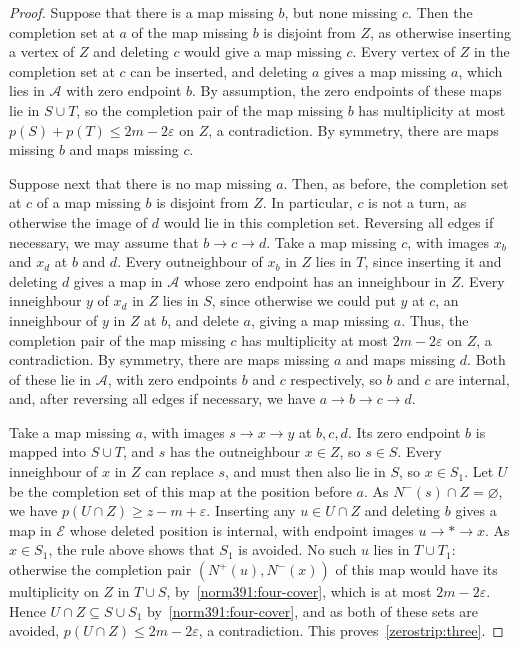 \begin{proof}
Suppose that there is a map missing $b$, but none missing $c$. Then the completion set at $a$ of the map missing $b$ is disjoint from $Z$, as otherwise inserting a vertex of $Z$ and deleting $c$ would give a map missing $c$. Every vertex of $Z$ in the completion set at $c$ can be inserted, and deleting $a$ gives a map missing $a$, which lies in $\mathcal A$ with zero endpoint $b$. By assumption, the zero endpoints of these maps lie in $S\cup T$, so the completion pair of the map missing $b$ has multiplicity at most $p(S)+p(T)\le2m-2\varepsilon$ on $Z$, a contradiction. By symmetry, there are maps missing $b$ and maps missing $c$.

Suppose next that there is no map missing $a$. Then, as before, the completion set at $c$ of a map missing $b$ is disjoint from $Z$. In particular, $c$ is not a turn, as otherwise the image of $d$ would lie in this completion set. Reversing all edges if necessary, we may assume that $b\to c\to d$. Take a map missing $c$, with images $x_b$ and $x_d$ at $b$ and $d$. Every outneighbour of $x_b$ in $Z$ lies in $T$, since inserting it and deleting $d$ gives a map in $\mathcal A$ whose zero endpoint has an inneighbour in $Z$. Every inneighbour $y$ of $x_d$ in $Z$ lies in $S$, since otherwise we could put $y$ at $c$, an inneighbour of $y$ in $Z$ at $b$, and delete $a$, giving a map missing $a$. Thus, the completion pair of the map missing $c$ has multiplicity at most $2m-2\varepsilon$ on $Z$, a contradiction. By symmetry, there are maps missing $a$ and maps missing $d$.
Both of these lie in $\mathcal A$, with zero endpoints $b$ and $c$ respectively, so $b$ and $c$ are internal, and, after reversing all edges if necessary, we have $a\to b\to c\to d$.

Take a map missing $a$, with images $s\to x\to y$ at $b,c,d$. Its zero endpoint $b$ is mapped into $S\cup T$, and $s$ has the outneighbour $x\in Z$, so $s\in S$. Every inneighbour of $x$ in $Z$ can replace $s$, and must then also lie in $S$, so $x\in S_1$.
Let $U$ be the completion set of this map at the position before $a$. As $N^-(s)\cap Z=\varnothing$, we have $p(U\cap Z)\ge z-m+\varepsilon$.
Inserting any $u\in U\cap Z$ and deleting $b$ gives a map in $\mathcal E$ whose deleted position is internal, with endpoint images $u\to*\to x$. As $x\in S_1$, the rule above shows that $S_1$ is avoided.
No such $u$ lies in $T\cup T_1$: otherwise the completion pair $(N^+(u),N^-(x))$ of this map would have its multiplicity on $Z$ in $T\cup S$, by~\eqref{norm391:four-cover}, which is at most $2m-2\varepsilon$.
Hence $U\cap Z\subseteq S\cup S_1$ by~\eqref{norm391:four-cover}, and as both of these sets are avoided, $p(U\cap Z)\le2m-2\varepsilon$, a contradiction.
This proves~\ref{zerostrip:three}.


\end{proof}
